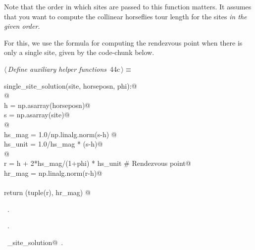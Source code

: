 \documentclass[11.5pt]{report}
\begin{document}
Note that the order in which sites are passed to this function matters. It 
assumes that you want to compute the collinear horseflies tour length for the 
sites \textit{in the given order.} 

For this, we use the formula for computing the rendezvous point when there is 
only a single site, given by the code-chunk below. 


\begin{flushleft} \small\label{scrap63}\raggedright\small
{} $\langle\,${\itshape Define auxiliary helper functions}\nobreak\ {\footnotesize {44c}}$\,\rangle\equiv$
\vspace{-1ex}
\begin{list}{}{} \item
\mbox{}\verb@def single_site_solution(site, horseposn, phi):@\\
\mbox{}\verb@     @\\
\mbox{}\verb@     h = np.asarray(horseposn)@\\
\mbox{}\verb@     s = np.asarray(site)@\\
\mbox{}\verb@     @\\
\mbox{}\verb@     hs_mag  = 1.0/np.linalg.norm(s-h) @\\
\mbox{}\verb@     hs_unit = 1.0/hs_mag * (s-h)@\\
\mbox{}\verb@     @\\
\mbox{}\verb@     r      = h +  2*hs_mag/(1+phi) * hs_unit # Rendezvous point@\\
\mbox{}\verb@     hr_mag = np.linalg.norm(r-h)@\\
\mbox{}\verb@@\\
\mbox{}\verb@     return (tuple(r), hr_mag) @\\
\mbox{}\verb@@{\NWsep}
\end{list}
\vspace{-1.5ex}
\footnotesize
\begin{list}{}{\setlength{\itemsep}{-\parsep}\setlength{\itemindent}{-\leftmargin}}
\item \NWtxtMacroDefBy\ .
\item \NWtxtMacroRefIn\ .
\item \NWtxtIdentsDefed\nobreak\  \verb@single_site_solution@\nobreak\ .
\item{}
\end{list}
\vspace{4ex}
\end{flushleft}
\end{document}
